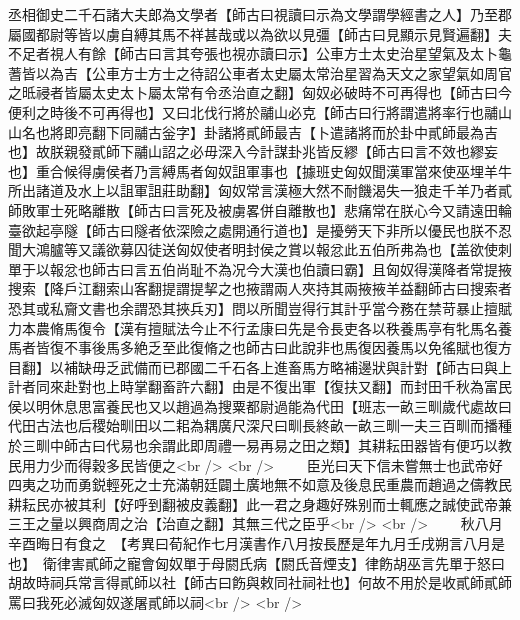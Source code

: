 丞相御史二千石諸大夫郎為文學者【師古曰視讀曰示為文學謂學經書之人】乃至郡屬國都尉等皆以虜自縛其馬不祥甚哉或以為欲以見彊【師古曰見顯示見賢遍翻】夫不足者視人有餘【師古曰言其夸張也視亦讀曰示】公車方士太史治星望氣及太卜龜蓍皆以為吉【公車方士方士之待詔公車者太史屬太常治星習為天文之家望氣如周官之㫝祲者皆屬太史太卜屬太常有令丞治直之翻】匈奴必破時不可再得也【師古曰今便利之時後不可再得也】又曰北伐行將於鬴山必克【師古曰行將謂遣將率行也鬴山山名也將即亮翻下同鬴古釡字】卦諸將貳師最吉【卜遣諸將而於卦中貳師最為吉也】故朕親發貳師下鬴山詔之必毋深入今計謀卦兆皆反繆【師古曰言不效也繆妄也】重合候得虜侯者乃言縛馬者匈奴詛軍事也【據班史匈奴聞漢軍當來使巫埋羊牛所出諸道及水上以詛軍詛莊助翻】匈奴常言漢極大然不耐饑渴失一狼走千羊乃者貳師敗軍士死略離散【師古曰言死及被虜畧併自離散也】悲痛常在朕心今又請遠田輪臺欲起亭隧【師古曰隧者依深險之處開通行道也】是擾勞天下非所以優民也朕不忍聞大鴻臚等又議欲募囚徒送匈奴使者明封侯之賞以報忿此五伯所弗為也【盖欲使刺單于以報忿也師古曰言五伯尚耻不為况今大漢也伯讀曰霸】且匈奴得漢降者常提掖搜索【降戶江翻索山客翻提謂提挈之也掖謂兩人夾持其兩掖掖羊益翻師古曰搜索者恐其或私齎文書也余謂恐其挾兵刃】問以所聞豈得行其計乎當今務在禁苛暴止擅賦力本農脩馬復令【漢有擅賦法今止不行孟康曰先是令長吏各以秩養馬亭有牝馬名養馬者皆復不事後馬多絶乏至此復脩之也師古曰此說非也馬復因養馬以免徭賦也復方目翻】以補缺毋乏武備而已郡國二千石各上進畜馬方略補邊狀與計對【師古曰與上計者同來赴對也上時掌翻畜許六翻】由是不復出軍【復扶又翻】而封田千秋為富民侯以明休息思富養民也又以趙過為搜粟都尉過能為代田【班志一畝三甽歲代處故曰代田古法也后稷始甽田以二耜為耦廣尺深尺曰甽長終畝一畝三甽一夫三百甽而播種於三甽中師古曰代易也余謂此即周禮一易再易之田之類】其耕耘田器皆有便巧以教民用力少而得穀多民皆便之<br />
<br />
　　臣光曰天下信未嘗無士也武帝好四夷之功而勇鋭輕死之士充滿朝廷闢土廣地無不如意及後息民重農而趙過之儔教民耕耘民亦被其利【好呼到翻被皮義翻】此一君之身趣好殊别而士輒應之誠使武帝兼三王之量以興商周之治【治直之翻】其無三代之臣乎<br />
<br />
　　秋八月辛酉晦日有食之　【考異曰荀紀作七月漢書作八月按長歷是年九月壬戌朔言八月是也】　衛律害貳師之寵會匈奴單于母閼氏病【閼氏音煙支】律飭胡巫言先單于怒曰胡故時祠兵常言得貳師以社【師古曰飭與敕同社祠社也】何故不用於是收貳師貳師罵曰我死必滅匈奴遂屠貳師以祠<br />
<br />
